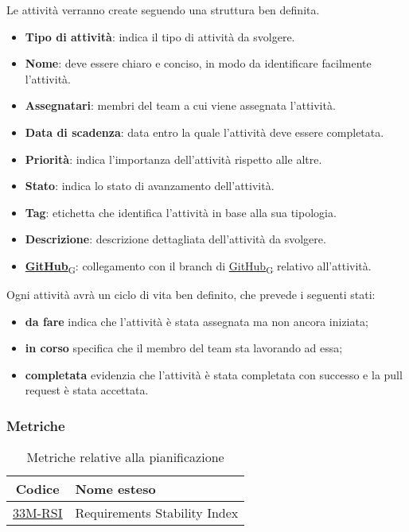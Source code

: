 Le attività verranno create seguendo una struttura ben definita.
\begin{itemize}
    \item \textbf{Tipo di attività}: indica il tipo di attività da svolgere.
    \item \textbf{Nome}: deve essere chiaro e conciso, in modo da identificare facilmente l'attività.
    \item \textbf{Assegnatari}: membri del team a cui viene assegnata l'attività.
    \item \textbf{Data di scadenza}: data entro la quale l'attività deve essere completata.
    \item \textbf{Priorità}: indica l'importanza dell'attività rispetto alle altre.
    \item \textbf{Stato}: indica lo stato di avanzamento dell'attività.
    \item \textbf{Tag}: etichetta che identifica l'attività in base alla sua tipologia.
    \item \textbf{Descrizione}: descrizione dettagliata dell'attività da svolgere.
    \item \href{https://7last.github.io/docs/pb/documentazione-interna/glossario\#github}{\textbf{GitHub}\textsubscript{G}}: collegamento con il branch di \href{https://7last.github.io/docs/pb/documentazione-interna/glossario\#github}{GitHub\textsubscript{G}} relativo all'attività.
\end{itemize}
Ogni attività avrà un ciclo di vita ben definito, che prevede i seguenti stati:
\begin{itemize}
    \item \textbf{da fare} indica che l'attività è stata assegnata ma non ancora iniziata;
    \item \textbf{in corso} specifica che il membro del team sta lavorando ad essa;
    \item \textbf{completata} evidenzia che l'attività è stata completata con successo e la pull request è stata accettata.
\end{itemize}

\subsubsection{Metriche}
\begin{table}[!h]
	\centering
	\begin{tabular}{ | c | l | }
		\hline
		\textbf{Codice}                      & \textbf{Nome esteso}         \\
		\hline
        \underline{\hyperlink{33M}{33M-RSI}} & Requirements Stability Index \\
		\hline
	\end{tabular}
	\caption{Metriche relative alla pianificazione}
\end{table}

